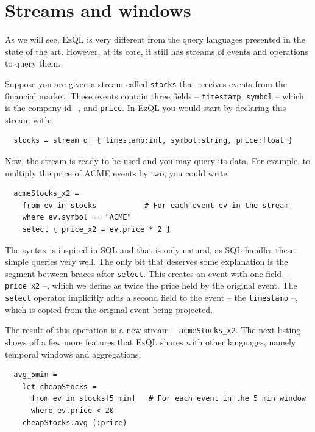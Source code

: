 
\section{Streams and windows}
\label{sec:streams-windows}

As we will see, EzQL is very different from the query languages
presented in the state of the art. However, at its core, it still has
streams of events and operations to query them.

Suppose you are given a stream called \verb=stocks= that receives
events from the financial market. These events contain three fields --
\verb=timestamp=, \verb=symbol= -- which is the company id --, and
\verb=price=. In EzQL you would start by declaring this stream with:

\begin{lstlisting}
  stocks = stream of { timestamp:int, symbol:string, price:float }
\end{lstlisting}

Now, the stream is ready to be used and you may query its data. For
example, to multiply the price of ACME events by two, you could write:

\begin{lstlisting}
  acmeStocks_x2 =
    from ev in stocks			# For each event ev in the stream
    where ev.symbol == "ACME"
    select { price_x2 = ev.price * 2 }
\end{lstlisting}

The syntax is inspired in SQL and that is only natural, as SQL handles
these simple queries very well. The only bit that deserves some
explanation is the segment between braces after \verb=select=. This
creates an event with one field -- \verb=price_x2= --, which we define
as twice the price held by the original event. The \verb=select=
operator implicitly adds a second field to the event -- the
\verb=timestamp= --, which is copied from the original event being
projected.

The result of this operation is a new stream --
\verb=acmeStocks_x2=. The next listing shows off a few more features
that EzQL shares with other languages, namely temporal windows and
aggregations:

\begin{lstlisting}
  avg_5min =
    let cheapStocks =
      from ev in stocks[5 min] 	 # For each event in the 5 min window
      where ev.price < 20
    cheapStocks.avg (:price)
\end{lstlisting}

